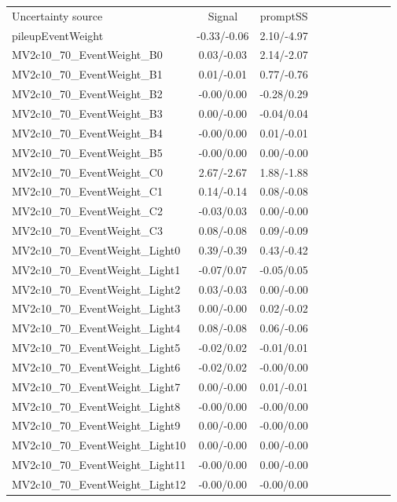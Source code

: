 \begin{table}[h]
\scriptsize
\begin{center}
\begin{tabular}{l|ccccccccc}
\hline
\hline
Uncertainty source &Signal &promptSS \\
pileupEventWeight &-0.33/-0.06 &2.10/-4.97 \\
MV2c10\_70\_EventWeight\_B0 &0.03/-0.03 &2.14/-2.07 \\
MV2c10\_70\_EventWeight\_B1 &0.01/-0.01 &0.77/-0.76 \\
MV2c10\_70\_EventWeight\_B2 &-0.00/0.00 &-0.28/0.29 \\
MV2c10\_70\_EventWeight\_B3 &0.00/-0.00 &-0.04/0.04 \\
MV2c10\_70\_EventWeight\_B4 &-0.00/0.00 &0.01/-0.01 \\
MV2c10\_70\_EventWeight\_B5 &-0.00/0.00 &0.00/-0.00 \\
MV2c10\_70\_EventWeight\_C0 &2.67/-2.67 &1.88/-1.88 \\
MV2c10\_70\_EventWeight\_C1 &0.14/-0.14 &0.08/-0.08 \\
MV2c10\_70\_EventWeight\_C2 &-0.03/0.03 &0.00/-0.00 \\
MV2c10\_70\_EventWeight\_C3 &0.08/-0.08 &0.09/-0.09 \\
MV2c10\_70\_EventWeight\_Light0 &0.39/-0.39 &0.43/-0.42 \\
MV2c10\_70\_EventWeight\_Light1 &-0.07/0.07 &-0.05/0.05 \\
MV2c10\_70\_EventWeight\_Light2 &0.03/-0.03 &0.00/-0.00 \\
MV2c10\_70\_EventWeight\_Light3 &0.00/-0.00 &0.02/-0.02 \\
MV2c10\_70\_EventWeight\_Light4 &0.08/-0.08 &0.06/-0.06 \\
MV2c10\_70\_EventWeight\_Light5 &-0.02/0.02 &-0.01/0.01 \\
MV2c10\_70\_EventWeight\_Light6 &-0.02/0.02 &-0.00/0.00 \\
MV2c10\_70\_EventWeight\_Light7 &0.00/-0.00 &0.01/-0.01 \\
MV2c10\_70\_EventWeight\_Light8 &-0.00/0.00 &-0.00/0.00 \\
MV2c10\_70\_EventWeight\_Light9 &0.00/-0.00 &-0.00/0.00 \\
MV2c10\_70\_EventWeight\_Light10 &0.00/-0.00 &0.00/-0.00 \\
MV2c10\_70\_EventWeight\_Light11 &-0.00/0.00 &0.00/-0.00 \\
MV2c10\_70\_EventWeight\_Light12 &-0.00/0.00 &-0.00/0.00 \\

\end{tabular}
\end{center}
\end{table}
